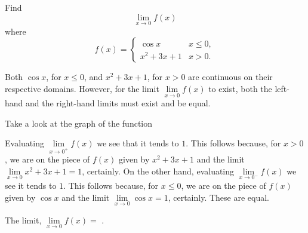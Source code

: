 \documentclass{ximera}
\begin{document}
\begin{question}
  Find 
  \[
  \displaystyle \lim_{x\to 0} f(x)
  \]
  where
  \[
  f(x) = \left\{\begin{array}{cl} \cos x & x\leq 0, \\ x^2+3x+1 & x>0. \end{array}\right.
  \]
  \begin{solution}
    \begin{hint}
     Both $\cos x$, for $x\leq0$, and $x^2+3x+1$, for $x>0$ are continuous on their respective domains. However, for the limit $\lim\limits_{x\to0}f(x)$ to exist, both the left-hand and the right-hand limits must exist and be equal.
    \end{hint}
     \begin{hint}
    	Take a look at the graph of the function
    \begin{center}
      \end{center} 
    \end{hint}
    \begin{hint}
     Evaluating $\lim\limits_{x\to0^{+}}f(x)$ we see that it tends to $1$. This follows because, for $x>0$, we are on the piece of $f(x)$ given by $x^2+3x+1$ and the limit $\lim\limits_{x\to0}x^2+3x+1=1$, certainly. On the other hand, evaluating $\lim\limits_{x\to0^{-}}f(x)$ we see it tends to $1$. This follows because, for $x\leq0$, we are on the piece of $f(x)$ given by $\cos x$ and the limit $\lim\limits_{x\to0}\cos x=1$, certainly. These are equal.
    \end{hint}
     The limit, $\lim\limits_{x\to0}f(x)=$
    .
  \end{solution}
\end{question}
\end{document}
